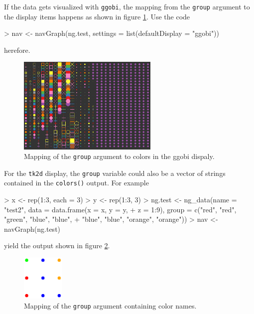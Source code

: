 \documentclass[12pt,oneside,titlepage,letter]{article}
\newcommand{\modify}[1]{{\color{blue}#1}}
\begin{document}
If the data gets visualized with \texttt{ggobi}, the mapping from the \texttt{group} argument to the display items happens as shown in figure \ref{fig:ggobicolors}. Use the code

\begin{Schunk}
\begin{Sinput}
> nav <- navGraph(ng.test, settings = list(defaultDisplay = "ggobi"))
\end{Sinput}
\end{Schunk}
herefore.

\begin{figure}[h]
  \label{fig:ggobicolors}
  \centering
  \includegraphics[width = 0.6\textwidth]{img/ggobicolors.png}
  \caption{Mapping of the \texttt{group} argument to colors in the ggobi dispaly.}  
\end{figure}

For the \modify{\texttt{tk2d}} display, the \texttt{group} variable could also be a vector of strings contained in the \texttt{colors()} output. For example

\begin{Schunk}
\begin{Sinput}
> x <- rep(1:3, each = 3)
> y <- rep(1:3, 3)
> ng.test <- ng_data(name = "test2", data = data.frame(x = x, y = y, 
+     z = 1:9), group = c("red", "red", "green", "blue", "blue", 
+     "blue", "blue", "orange", "orange"))
> nav <- navGraph(ng.test)
\end{Sinput}
\end{Schunk}

yield the output shown in figure \ref{fig:tk2dCols2}.

\begin{figure}[h]
  \label{fig:tk2dCols2}
  \centering
  \includegraphics[width = 2cm]{img/tk2dcolors2.png}
  \caption{Mapping of the \texttt{group} argument containing color names.}  
\end{figure}
\end{document}
